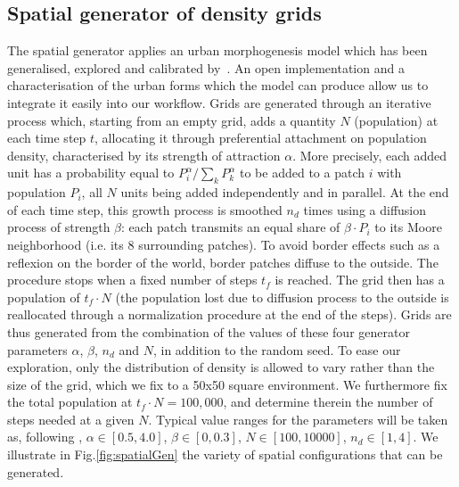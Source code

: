 \documentclass{JASSS}
\begin{document}
\subsection{Spatial generator of density grids}

The spatial generator applies an urban morphogenesis model \citep{Batty2007} which has been generalised, explored and calibrated by~\citet{raimbault2018calibration}. An open implementation and a characterisation of the urban forms which the model can produce allow us to integrate it easily into our workflow. Grids are generated through an iterative process which, starting from an empty grid, adds a quantity $N$ (population) at each time step $t$, allocating it through preferential attachment on population density, characterised by its strength of attraction $\alpha$. More precisely, each added unit has a probability equal to $P_i^{\alpha}/\sum_k P_k^{\alpha}$ to be added to a patch $i$ with population $P_i$, all $N$ units being added independently and in parallel. At the end of each time step, this growth process is smoothed $n_d$ times using a diffusion process of strength $\beta$: each patch transmits an equal share of $\beta\cdot P_i$ to its Moore neighborhood (i.e. its 8 surrounding patches). To avoid border effects such as a reflexion on the border of the world, border patches diffuse to the outside. The procedure stops when a fixed number of steps $t_f$ is reached. The grid then has a population of $t_f \cdot N$ (the population lost due to diffusion process to the outside is reallocated through a normalization procedure at the end of the steps). Grids are thus generated from the combination of the values of these four generator parameters $\alpha$, $\beta$, $n_d$ and $N$, in addition to the random seed. To ease our exploration, only the distribution of density is allowed to vary rather than the size of the grid, which we fix to a 50x50 square environment. We furthermore fix the total population at $t_f\cdot N = 100,000$, and determine therein the number of steps needed at a given $N$. Typical value ranges for the  parameters will be taken as, following \citet{raimbault2018calibration}, $\alpha\in\left[0.5,4.0\right]$, $\beta \in\left[0,0.3\right] $, $N\in \left[100,10000\right]$, $n_d\in\left[1,4\right]$. We illustrate in Fig.\ref{fig:spatialGen} the variety of spatial configurations that can be generated.
\end{document}
